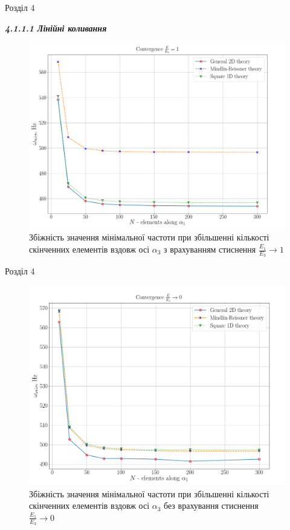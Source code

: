 \documentclass[8pt]{beamer}
\numberwithin{figure}{section}
\numberwithin{equation}{section}
\numberwithin{table}{section}
\begin{document}
\begin{frame}{Розділ 4}

\textbf{\textit{4.1.1.1 Лінійні коливання}}

\begin{figure}
	\includegraphics[scale=0.23]{pic/conv_all.png}
		\caption{Збіжність значення мінімальної частоти при збільшенні кількості скінченних елементів вздовж осі $\alpha_3$ з врахуванням стиснення $\frac{E_1}{E_3}\rightarrow1$}
		\label{fig:EE31}
\end{figure}

\end{frame}

\begin{frame}{Розділ 4}
\begin{figure}
	\includegraphics[scale=0.23]{pic/conv_all_e3.png}
		\caption{Збіжність значення мінімальної частоти при збільшенні кількості скінченних елементів вздовж осі $\alpha_3$ без врахування стиснення $\frac{E_1}{E_3}\rightarrow0$}
		\label{fig:EE30}
\end{figure}

\end{frame}
\end{document}
